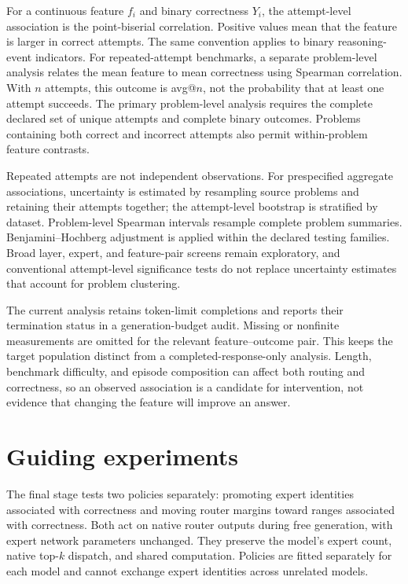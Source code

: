\documentclass[12pt,a4paper,twoside,openright]{book}
\begin{document}
For a continuous feature $f_i$ and binary correctness $Y_i$, the attempt-level
association is the point-biserial correlation. Positive values mean that the
feature is larger in correct attempts. The same convention applies to binary
reasoning-event indicators. For repeated-attempt benchmarks, a separate
problem-level analysis relates the mean feature to mean correctness using
Spearman correlation. With $n$ attempts, this outcome is avg@$n$, not the
probability that at least one attempt succeeds. The primary problem-level
analysis requires the complete declared set of unique attempts and complete
binary outcomes. Problems containing both correct and incorrect attempts
also permit within-problem feature contrasts.

Repeated attempts are not independent observations. For prespecified
aggregate associations, uncertainty is estimated by resampling source
problems and retaining their attempts together; the attempt-level bootstrap
is stratified by dataset. Problem-level Spearman intervals resample complete
problem summaries. Benjamini--Hochberg adjustment is applied within the
declared testing families. Broad layer, expert, and feature-pair screens
remain exploratory, and conventional attempt-level significance tests do
not replace uncertainty estimates that account for problem clustering.

The current analysis retains token-limit completions and reports their
termination status in a generation-budget audit. Missing or nonfinite
measurements are omitted for the relevant feature--outcome pair. This keeps
the target population distinct from a completed-response-only analysis.
Length, benchmark difficulty, and episode composition can affect both routing
and correctness, so an observed association is a candidate for intervention,
not evidence that changing the feature will improve an answer.

\section{Guiding experiments}
\label{sec:method-guiding}

The final stage tests two policies separately: promoting expert identities
associated with correctness and moving router margins toward ranges
associated with correctness. Both act on native router outputs during free
generation, with expert network parameters unchanged. They preserve the
model's expert count, native top-$k$ dispatch, and shared computation.
Policies are fitted separately for each model and cannot exchange expert
identities across unrelated models.
\end{document}
